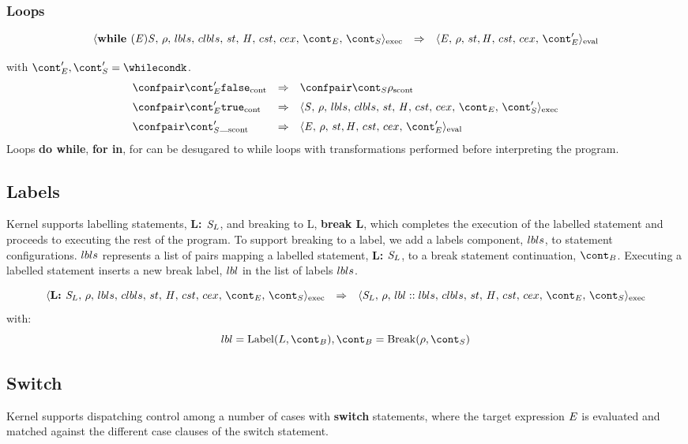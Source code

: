 \documentclass{article}
\begin{document}
\subsubsection{Loops}
\[
  \begin{array}{lcl}
	\execconf{\textbf{while } (\expr) \stmt}{\env}{\lbls}{\clbls}{\handler}{\cstrace}{\cex}{\econt}{\scont}
	& \Rightarrow &
	\evalconf{\expr}{\env}{\strace}{\cstrace}{\cex}{\econt'}\\[2mm]
  \end{array}
\]
with $\econt', \scont' = \whilecondk$.
\[
  \begin{array}{lcl}
	\contconf{\econt'}{\false}
	& \Rightarrow &
	\scontconf{\scont}{\env}\\[2mm]

	\contconf{\econt'}{\true}
	& \Rightarrow &
	\execconf{\stmt}{\env}{\lbls}{\clbls}{\handler}{\cstrace}{\cex}{\econt}{\scont'}\\[2mm]

	\scontconf{\scont'}{\_}
	& \Rightarrow &
	\evalconf{\expr}{\env}{\strace}{\cstrace}{\cex}{\econt'}\\
  \end{array}
\]
Loops \textbf{do while}, \textbf{for in}, for can be desugared to while loops with transformations performed before interpreting the program.

\subsection{Labels}

Kernel supports labelling statements, \textbf{L: $\mathit{S}_{L}$}, and breaking to L, \textbf{break L}, which completes the execution of the labelled statement and proceeds to executing the rest of the program.
To support breaking to a label, we add a labels component, $lbls$, to statement configurations. $lbls$ represents a list of pairs mapping a labelled statement, \textbf{L: $\mathit{S}_L$}, to a break statement continuation, $\bcont$. Executing a labelled statement inserts a new break label, $lbl$ in the list of labels $lbls$.

\[
  \begin{array}{lcl}
	\execconf{\textbf{L: }\stmt_{L}}{\env}{\lbls}{\clbls}{\handler}{\cstrace}{\cex}{\econt}{\scont}
	& \Rightarrow &
	\execconf{\stmt_{L}}{\env}{\lbl :: \lbls}{\clbls}{\handler}{\cstrace}{\cex}{\econt}{\scont}
  \end{array}
\]
with:
\[\lbl = \mathrm{Label}(L, \bcont), \bcont = \mathrm{Break}(\env, \scont)\]
\subsection{Switch}
Kernel supports dispatching control among a number of cases with \textbf{switch} statements, where the target expression $\mathit{E}$ is evaluated and matched against the different case clauses of the switch statement. 
 
\end{document}
